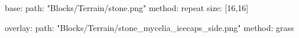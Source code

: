 base:
  path: "Blocks/Terrain/stone.png"
  method: repeat
  size: [16,16]

overlay:
  path: "Blocks/Terrain/stone_mycelia_icecaps_side.png"
  method: grass